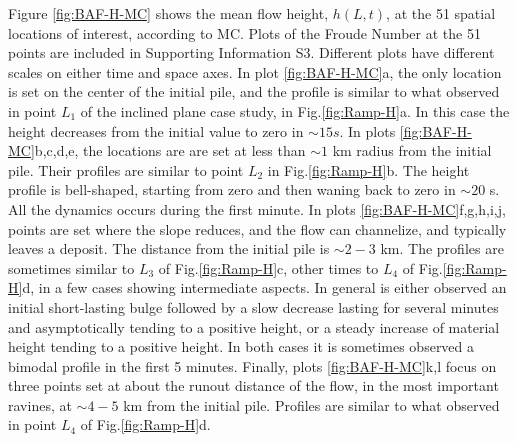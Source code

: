 \documentclass{article}
\begin{document}
Figure \ref{fig:BAF-H-MC} shows the mean flow height, $h(L,t)$, at the 51 spatial locations of interest, according to MC. Plots of the Froude Number at the 51 points are included in Supporting Information S3. Different plots have different scales on either time and space axes. In plot \ref{fig:BAF-H-MC}a, the only location is set on the center of the initial pile, and the profile is similar to what observed in point $L_1$ of the inclined plane case study, in Fig.\ref{fig:Ramp-H}a. In this case the height decreases from the initial value to zero in $\sim 15 s$. In plots \ref{fig:BAF-H-MC}b,c,d,e, the locations are are set at less than $\sim 1$ km radius from the initial pile. Their profiles are similar to point $L_2$ in Fig.\ref{fig:Ramp-H}b. The height profile is bell-shaped, starting from zero and then waning back to zero in $\sim 20$ s. All the dynamics occurs during the first minute. In plots \ref{fig:BAF-H-MC}f,g,h,i,j, points are set where the slope reduces, and the flow can channelize, and typically leaves a deposit. The distance from the initial pile is $\sim 2-3$ km. The profiles are sometimes similar to $L_3$ of Fig.\ref{fig:Ramp-H}c, other times to $L_4$ of Fig.\ref{fig:Ramp-H}d, in a few cases showing intermediate aspects. In general is either observed an initial short-lasting bulge followed by a slow decrease lasting for several minutes and asymptotically tending to a positive height, or a steady increase of material height tending to a positive height. In both cases it is sometimes observed a bimodal profile in the first 5 minutes. Finally, plots \ref{fig:BAF-H-MC}k,l focus on three points set at about the runout distance of the flow, in the most important ravines, at $\sim 4-5$ km from the initial pile. Profiles are similar to what observed in point $L_4$ of Fig.\ref{fig:Ramp-H}d.
\end{document}
